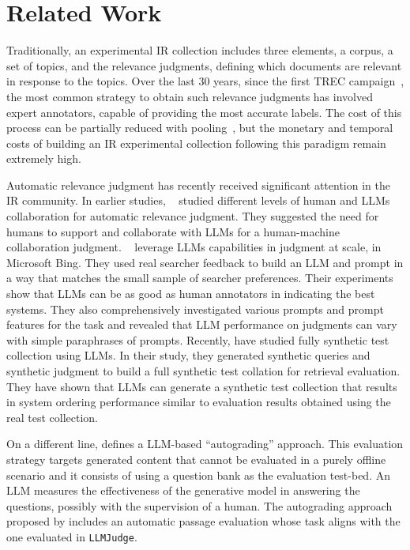\section{Related Work}
\label{sec:relatedwork}
Traditionally, an experimental \ac{IR} collection includes three elements, a corpus, a set of topics, and the relevance judgments, defining which documents are relevant in response to the topics.
Over the last 30 years, since the first TREC campaign~\cite{DBLP:conf/trec/1992}, the most common strategy to obtain such relevance judgments has involved expert annotators, capable of providing the most accurate labels. 
The cost of this process can be partially reduced with pooling~\cite{croft2009search}, but the monetary and temporal costs of building an \ac{IR} experimental collection following this paradigm remain extremely high.

Automatic relevance judgment has recently received significant attention in the IR community. In earlier studies, ~\citet{faggioli2023perspectives} studied different levels of human and LLMs collaboration for automatic relevance judgment. They suggested the need for humans to support and collaborate with LLMs for a human-machine collaboration judgment. ~\citet{thomas2023large} leverage LLMs capabilities in judgment at scale, in Microsoft Bing. They used real searcher feedback to build an LLM and prompt in a way that matches the small sample of searcher preferences. Their experiments show that LLMs can be as good as human annotators in indicating the best systems. They also comprehensively investigated various prompts and prompt features for the task and revealed that LLM performance on judgments can vary with simple paraphrases of prompts. Recently, \citet{rahmani2024synthetic} have studied fully synthetic test collection using LLMs. In their study, they generated synthetic queries and synthetic judgment to build a full synthetic test collation for retrieval evaluation. They have shown that LLMs can generate a synthetic test collection that results in system ordering performance similar to evaluation results obtained using the real test collection.

On a different line, \citet{DBLP:conf/sigir/Dietz24} defines a LLM-based ``autograding'' approach. This evaluation strategy targets generated content that cannot be evaluated in a purely offline scenario and it consists of using a question bank as the evaluation test-bed. An \ac{LLM} measures the effectiveness of the generative model in answering the questions, possibly with the supervision of a human. The autograding approach proposed by \citet{DBLP:conf/sigir/Dietz24} includes an automatic passage evaluation whose task aligns with the one evaluated in \texttt{LLMJudge}.

